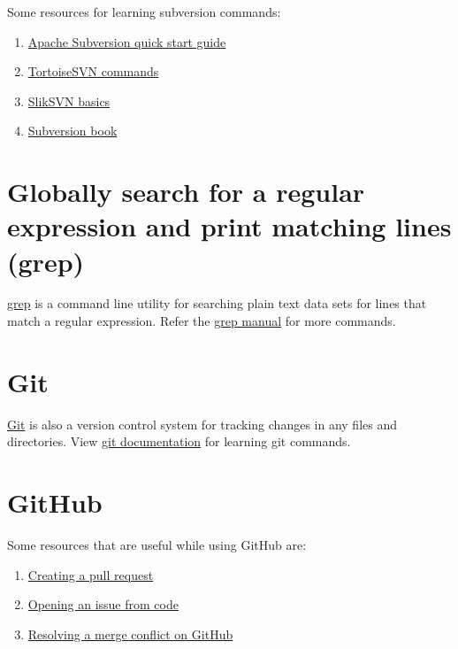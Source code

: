 \documentclass[
]{book}
\begin{document}
Some resources for learning subversion commands:

\begin{enumerate}
\def\labelenumi{\arabic{enumi}.}
\item
  \href{http://subversion.apache.org/quick-start}{Apache Subversion quick start guide}
\item
  \href{https://tortoisesvn.net/docs/nightly/TortoiseSVN_en/tsvn-cli-main.html}{TortoiseSVN commands}
\item
  \href{https://sliksvn.com/support/subversion-basics-using-check-out-update-check-in-commit/}{SlikSVN basics}
\item
  \href{http://svnbook.red-bean.com/}{Subversion book}
\end{enumerate}

\hypertarget{globally-search-for-a-regular-expression-and-print-matching-lines-grep}{%
\section{Globally search for a regular expression and print matching lines (grep)}\label{globally-search-for-a-regular-expression-and-print-matching-lines-grep}}

\href{https://en.wikipedia.org/wiki/Grep}{grep} is a command line utility for searching plain text data sets for lines that match a regular expression. Refer the \href{https://www.gnu.org/software/grep/manual/grep.html}{grep manual} for more commands.

\hypertarget{git}{%
\section{Git}\label{git}}

\href{https://en.wikipedia.org/wiki/Git}{Git} is also a version control system for tracking changes in any files and directories. View \href{https://git-scm.com/doc}{git documentation} for learning git commands.

\hypertarget{github}{%
\section{GitHub}\label{github}}

Some resources that are useful while using GitHub are:

\begin{enumerate}
\def\labelenumi{\arabic{enumi}.}
\item
  \href{https://docs.github.com/en/github/collaborating-with-issues-and-pull-requests/creating-a-pull-request}{Creating a pull request}
\item
  \href{https://docs.github.com/en/github/managing-your-work-on-github/opening-an-issue-from-code}{Opening an issue from code}
\item
  \href{https://docs.github.com/en/github/collaborating-with-issues-and-pull-requests/resolving-a-merge-conflict-on-github}{Resolving a merge conflict on GitHub}
\end{enumerate}

  
\end{document}
